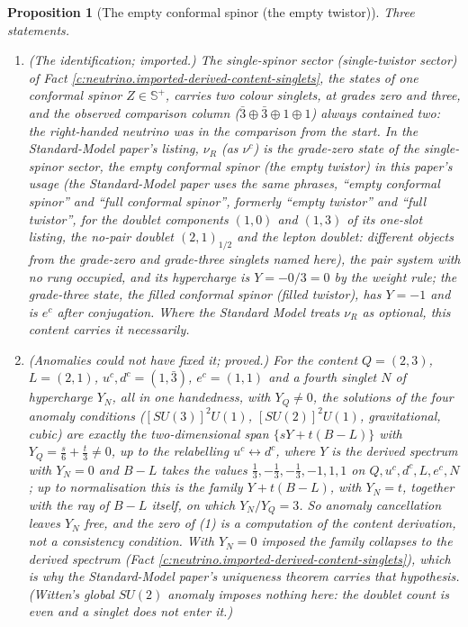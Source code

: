 \documentclass[11pt]{article}
\newtheorem{proposition}[theorem]{Proposition}
\theoremstyle{definition}
\theoremstyle{plain}
\newcommand{\changedmark}[2]{\marginpar{\raggedright\scriptsize\color{#1}#2}}
\providecommand{\CS}{}\renewcommand{\CS}{{\mathbb{S}^{+}}}
\begin{document}
\begin{proposition}[The empty conformal spinor (the empty twistor)]\label{c:neutrino.empty-twistor}
\changedmark{gray}{reworded}
Three statements.
\begin{enumerate}
\item \emph{(The identification; imported.)} The single-spinor sector (single-twistor sector) of Fact \ref{c:neutrino.imported-derived-content-singlets}, the states of one conformal spinor $Z \in \CS$, carries two colour singlets, at grades zero and three, and the observed comparison column ($\bar{3} \oplus \bar{3} \oplus 1 \oplus 1$) always contained two: the right-handed neutrino was in the comparison from the start. In the Standard-Model paper's listing, $\nu_{R}$ (as $\nu^{c}$) is the grade-zero state of the single-spinor sector, the \emph{empty conformal spinor} (the empty twistor) in this paper's usage (the Standard-Model paper uses the same phrases, ``empty conformal spinor'' and ``full conformal spinor'', formerly ``empty twistor'' and ``full twistor'', for the doublet components $(1,0)$ and $(1,3)$ of its one-slot listing, the no-pair doublet $(2,1)_{1/2}$ and the lepton doublet: different objects from the grade-zero and grade-three singlets named here), the pair system with no rung occupied, and its hypercharge is $Y = -0/3 = 0$ by the weight rule; the grade-three state, the filled conformal spinor (filled twistor), has $Y = -1$ and is $e^{c}$ after conjugation. Where the Standard Model treats $\nu_{R}$ as optional, this content carries it necessarily.
\item \emph{(Anomalies could not have fixed it; proved.)} For the content $Q = (2,3)$, $L = (2,1)$, $u^{c}, d^{c} = (1,\bar{3})$, $e^{c} = (1,1)$ and a fourth singlet $N$ of hypercharge $Y_{N}$, all in one handedness, with $Y_{Q} \neq 0$, the solutions of the four anomaly conditions ($[SU(3)]^{2}U(1)$, $[SU(2)]^{2}U(1)$, gravitational, cubic) are \emph{exactly} the two-dimensional span $\{sY + t(B - L)\}$ with $Y_{Q} = \tfrac{s}{6} + \tfrac{t}{3} \neq 0$, up to the relabelling $u^{c} \leftrightarrow d^{c}$, where $Y$ is the derived spectrum with $Y_{N} = 0$ and $B - L$ takes the values $\tfrac13, -\tfrac13, -\tfrac13, -1, 1, 1$ on $Q, u^{c}, d^{c}, L, e^{c}, N$; up to normalisation this is the family $Y + t(B - L)$, with $Y_{N} = t$, together with the ray of $B - L$ itself, on which $Y_{N}/Y_{Q} = 3$. So anomaly cancellation leaves $Y_{N}$ free, and the zero of (1) is a computation of the content derivation, not a consistency condition. With $Y_{N} = 0$ imposed the family collapses to the derived spectrum (Fact \ref{c:neutrino.imported-derived-content-singlets}), which is why the Standard-Model paper's uniqueness theorem carries that hypothesis. (Witten's global $SU(2)$ anomaly imposes nothing here: the doublet count is even and a singlet does not enter it.)

\end{enumerate}
\end{proposition}
\end{document}
